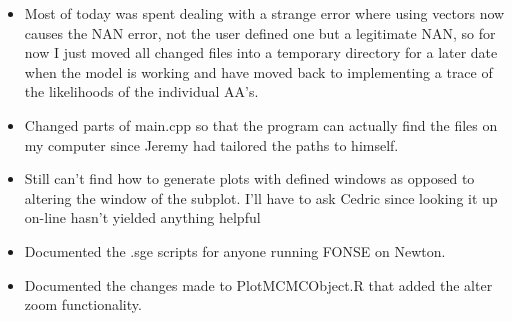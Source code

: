 \documentclass[11pt]{labbook}
\begin{document}
    \begin{itemize}
        \item Most of today was spent dealing with a strange error where using vectors now causes the NAN error, not the user defined one but a legitimate NAN, so for now I just moved all changed files into a temporary directory for a later date when the model is working and have moved back to implementing a trace of the likelihoods of the individual AA's.
        \item Changed parts of main.cpp so that the program can actually find the files on my computer since Jeremy had tailored the paths to himself.
        \item Still can't find how to generate plots with defined windows as opposed to altering the window of the subplot. I'll have to ask Cedric since looking it up on-line hasn't yielded anything helpful
        \item Documented the .sge scripts for anyone running FONSE on Newton.
        \item Documented the changes made to PlotMCMCObject.R that added the alter zoom functionality.
    \end{itemize}
    
\end{document}

